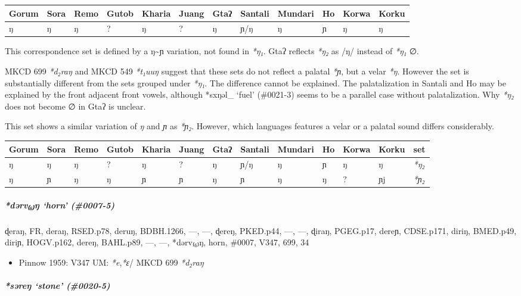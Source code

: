 \documentclass[a4paper,]{article}
\providecommand{\tightlist}{%
  \setlength{\itemsep}{0pt}\setlength{\parskip}{0pt}}
\let\oldsubparagraph\subparagraph
\renewcommand{\subparagraph}[1]{\oldsubparagraph{#1}\mbox{}}
\begin{document}
\begin{longtable}[]{@{}llllllllllll@{}}
\toprule
Gorum & Sora & Remo & Gutob & Kharia & Juang & Gtaʔ & Santali & Mundari
& Ho & Korwa & Korku\tabularnewline
\midrule
\endhead
ŋ & ŋ & ŋ & ? & ŋ & ? & ŋ & ɲ/ŋ & ŋ & ɲ & ŋ & ŋ\tabularnewline
\bottomrule
\end{longtable}

This correspondence set is defined by a ŋ\textasciitilde{}ɲ variation,
not found in \emph{*ŋ₁}. Gtaʔ reflects \emph{*ŋ₂} as /ŋ/ instead of
\emph{*ŋ₁} ∅.

MKCD 699 \emph{*d₂raŋ} and MKCD 549 \emph{*t₁uuŋ} suggest that these
sets do not reflect a palatal \emph{*ɲ}, but a velar \emph{*ŋ}. However
the set is substantially different from the sets grouped under
\emph{*ŋ₁}. The difference cannot be explained. The palatalization in
Santali and Ho may be explained by the front adjacent front vowels,
although *sxŋəl\_ `fuel' (\#0021-3) seems to be a parallel case without
palatalization. Why \emph{*ŋ₂} does not become ∅ in Gtaʔ is unclear.

This set shows a similar variation of \emph{ŋ} and \emph{ɲ} as
\emph{*ɲ₂}. However, which languages features a velar or a palatal sound
differs considerably.

\begin{longtable}[]{@{}lllllllllllll@{}}
\toprule
Gorum & Sora & Remo & Gutob & Kharia & Juang & Gtaʔ & Santali & Mundari
& Ho & Korwa & Korku & set\tabularnewline
\midrule
\endhead
ŋ & ŋ & ŋ & ? & ŋ & ? & ŋ & ɲ/ŋ & ŋ & ɲ & ŋ & ŋ &
\emph{*ŋ₂}\tabularnewline
ŋ & ɲ & ŋ & ŋ & ɲ & ɲ & ŋ & ɲ & ŋ & ŋ & ? & ɲj &
\emph{*ɲ₂}\tabularnewline
\bottomrule
\end{longtable}

\subparagraph{\texorpdfstring{\emph{*dərv₍₆₎ŋ} `horn'
(\#0007-5)}{*dərv₍₆₎ŋ horn (\#0007-5)}}\label{dux259rvux14b-horn-0007-5}

ɖeraŋ, FR, deraŋ, RSED.p78, deruŋ, BDBH.1266, ---, ---, ɖereŋ, PKED.p44,
---, ---, ɖiraŋ, PGEG.p17, dereɲ, CDSE.p171, diriŋ, BMED.p49, diriɲ,
HOGV.p162, dereŋ, BAHL.p89, ---, ---, *dərv₍₆₎ŋ, horn, \#0007, V347,
699, 34

\begin{itemize}
\tightlist
\item
  Pinnow 1959: V347 UM: \emph{*e},\emph{*ɛ}/ MKCD 699 \emph{*d₂raŋ}
\end{itemize}

\subparagraph{\texorpdfstring{\emph{*səreŋ} `stone'
(\#0020-5)}{*səreŋ stone (\#0020-5)}}\label{sux259reux14b-stone-0020-5}
\end{document}
